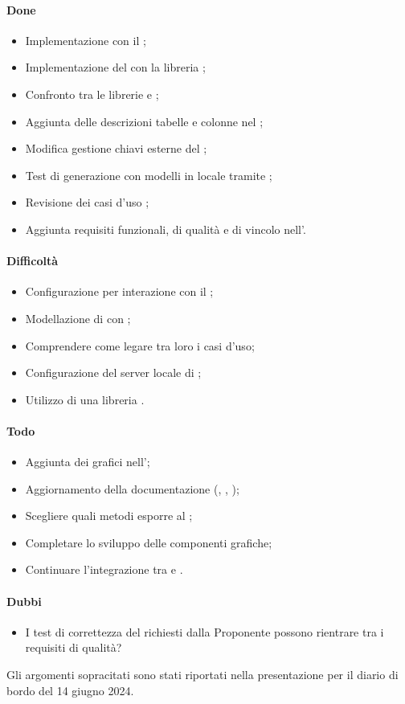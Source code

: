 \paragraph{Done}
\begin{itemize}
	\item Implementazione  con il  ;
	\item Implementazione del  con la libreria ;
	\item Confronto tra le librerie  e ;
	\item Aggiunta delle descrizioni tabelle e colonne nel ;
	\item Modifica gestione chiavi esterne del ;
	\item Test di generazione  con modelli in locale tramite ;
	\item Revisione dei casi d’uso \AdR;
	\item Aggiunta requisiti funzionali, di qualità e di vincolo nell'\AdR.
	
\end{itemize}
\paragraph{Difficoltà}
\begin{itemize}
	\item Configurazione  per interazione con il ;
	\item Modellazione di  con ;
	\item Comprendere come legare tra loro i casi d’uso;
	\item Configurazione del server locale di ;
	\item Utilizzo di una libreria .
\end{itemize}	
\paragraph{Todo}
\begin{itemize}
	\item Aggiunta dei grafici nell’\AdR;
	\item Aggiornamento della documentazione (\PdP, \PdQ, \AdR);
	\item Scegliere quali metodi esporre al ;
	\item Completare lo sviluppo delle componenti grafiche;
	\item Continuare l’integrazione tra  e .		
\end{itemize}
\paragraph{Dubbi}
\begin{itemize}
	\item I test di correttezza del  richiesti dalla Proponente possono rientrare tra i requisiti di qualità?
\end{itemize}

\par Gli argomenti sopracitati sono stati riportati nella presentazione per il diario di bordo del 14 giugno 2024.
